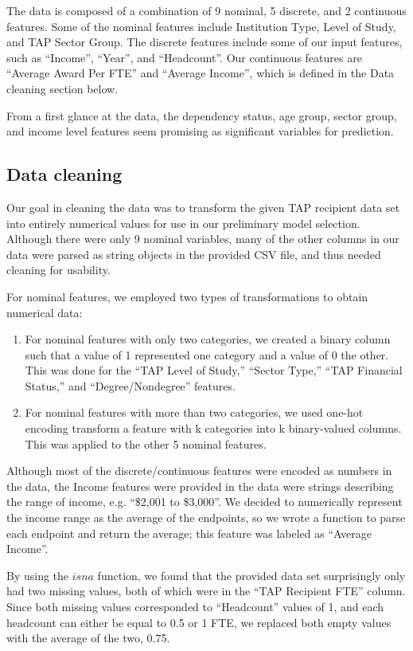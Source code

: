 \documentclass[11pt, fleqn]{article}
\begin{document}
The data is composed of a combination of 9 nominal, 5 discrete, and 2 continuous features. Some of the nominal features include Institution Type, Level of Study, and TAP Sector Group. The discrete features include some of our input features, such as ``Income'', ``Year'', and ``Headcount''. Our continuous features are ``Average Award Per FTE'' and ``Average Income'', which is defined in the Data cleaning section below.

From a first glance at the data, the dependency status, age group, sector group, and income level features seem promising as significant variables for prediction.


\subsection{Data cleaning}
Our goal in cleaning the data was to transform the given TAP recipient data set into entirely numerical values for use in our preliminary model selection. Although there were only 9 nominal variables, many of the other columns in our data were parsed as string objects in the provided CSV file, and thus needed cleaning for usability.

For nominal features, we employed two types of transformations to obtain numerical data:
\begin{enumerate} [(1)]
	\item 
		For nominal features with only two categories, we created a binary column such that a value of 1 represented one category and a value of 0 the other. This was done for the “TAP Level of Study,” “Sector Type,” “TAP Financial Status,” and “Degree/Nondegree” features.
	\item
		For nominal features with more than two categories, we used one-hot encoding transform a feature with k categories into k binary-valued columns. This was applied to the other 5 nominal features.

\end{enumerate}

Although most of the discrete/continuous features were encoded as numbers in the data, the Income features were provided in the data were strings describing the range of income, e.g. ``\$2,001 to \$3,000''. We decided to numerically represent the income range as the average of the endpoints, so we wrote a function to parse each endpoint and return the average; this feature was labeled as ``Average Income''.

By using the $isna$ function, we found that the provided data set surprisingly only had two missing values, both of which were in the ``TAP Recipient FTE'' column. Since both missing values corresponded to ``Headcount'' values of 1, and each headcount can either be equal to 0.5 or 1 FTE, we replaced both empty values with the average of the two, 0.75.
\end{document}
